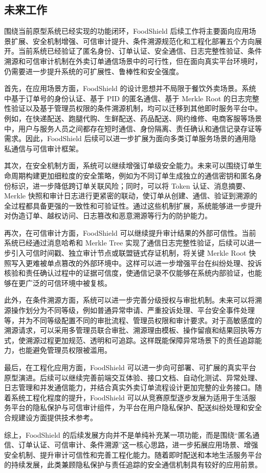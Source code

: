 \subsection{未来工作}

围绕当前原型系统已经实现的功能闭环，FoodShield 后续工作将主要面向应用场景扩展、安全机制增强、可信审计提升、条件溯源规范化和工程化部署五个方向展开。当前系统已经验证了匿名身份、订单认证、安全通信、日志完整性验证、条件溯源和可信审计机制在外卖订单通信场景中的可行性，但在面向真实平台环境时，仍需要进一步提升系统的可扩展性、鲁棒性和安全强度。

首先，在应用场景方面，FoodShield 的设计思想并不局限于餐饮外卖场景。系统中基于订单号的身份认证、基于 PID 的匿名通信、基于 Merkle Root 的日志完整性验证以及基于管理员权限的条件溯源机制，均可以迁移到其他即时服务平台中。例如，在快递配送、跑腿代购、生鲜配送、药品配送、网约维修、电商客服等场景中，用户与服务人员之间都存在短时通信、身份隔离、责任确认和通信记录存证等需求。因此，FoodShield 后续可以进一步扩展为面向多类订单服务场景的通用隐私通信与可信审计框架。

其次，在安全机制方面，系统可以继续增强订单级安全能力。未来可以围绕订单生命周期构建更加细粒度的安全策略，例如为不同订单生成独立的通信密钥和匿名身份标识，进一步降低跨订单关联风险；同时，可以将 Token 认证、消息摘要、Merkle 快照和审计日志进行更紧密的联动，使订单从创建、通信、验证到溯源的全过程都具备更强的一致性和可验证性。通过这些机制扩展，系统能够进一步提升对伪造订单、越权访问、日志篡改和恶意溯源等行为的防护能力。

再次，在可信审计方面，FoodShield 可以继续提升审计结果的外部可信性。当前系统已经通过消息哈希和 Merkle Tree 实现了通信日志完整性验证，后续可以进一步引入可信时间戳、独立审计节点或联盟链式存证机制，将关键 Merkle Root 快照写入更难被单点篡改的外部环境中。这样可以进一步增强平台在纠纷处理、投诉核验和责任确认过程中的证据可信度，使通信记录不仅能够在系统内部验证，也能够在更广泛的可信环境中被复核。

此外，在条件溯源方面，系统可以进一步完善分级授权与审批机制。未来可以将溯源操作划分为不同等级，例如普通异常申请、严重投诉处理、平台安全事件处理等，并为不同等级配置不同的审批流程、管理员权限和审计要求。对于高敏感度的溯源请求，可以采用多管理员联合审批、溯源理由模板、操作留痕和结果回执等方式，使溯源过程更加规范、透明和可追踪。这样既能保障异常场景下的责任追踪能力，也能避免管理员权限被滥用。

最后，在工程化应用方面，FoodShield 可以进一步向可部署、可扩展的真实平台原型演进。后续可以继续完善前端交互体验、接口文档、自动化测试、异常处理、日志管理和并发通信能力，并结合真实外卖订单流程设计更加完整的业务接口。随着系统工程化程度的提升，FoodShield 可以从竞赛原型逐步发展为适用于生活服务平台的隐私保护与可信审计组件，为平台在用户隐私保护、配送纠纷处理和安全合规建设方面提供技术参考。

综上，FoodShield 的后续发展方向并不是单纯补充某一项功能，而是围绕“匿名通信、订单认证、可信审计、条件溯源”这一核心思路，进一步拓展应用场景、增强安全机制、提升审计可信性和完善工程化能力。随着即时配送和本地生活服务平台的持续发展，此类兼顾隐私保护与责任追踪的安全通信机制具有较好的应用前景。
